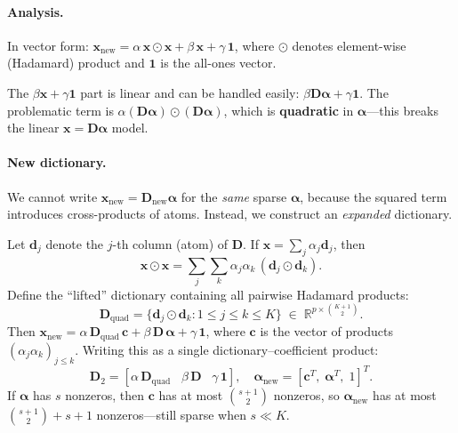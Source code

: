 \documentclass[11pt]{article}
\begin{document}
\paragraph{Analysis.}
In vector form: $\boldsymbol{x}_{\text{new}} = \alpha\,\boldsymbol{x} \odot \boldsymbol{x} + \beta\,\boldsymbol{x} + \gamma\,\boldsymbol{1}$,
where $\odot$ denotes element-wise (Hadamard) product and $\boldsymbol{1}$ is the all-ones vector.

The $\beta\boldsymbol{x} + \gamma\boldsymbol{1}$ part is linear and can be handled easily:
$\beta\boldsymbol{D}\boldsymbol{\alpha} + \gamma\boldsymbol{1}$.
The problematic term is $\alpha(\boldsymbol{D}\boldsymbol{\alpha})\odot(\boldsymbol{D}\boldsymbol{\alpha})$,
which is \textbf{quadratic} in $\boldsymbol{\alpha}$---this breaks the linear
$\boldsymbol{x} = \boldsymbol{D}\boldsymbol{\alpha}$ model.

\paragraph{New dictionary.}
We cannot write $\boldsymbol{x}_{\text{new}} = \boldsymbol{D}_{\text{new}}\boldsymbol{\alpha}$
for the \emph{same} sparse $\boldsymbol{\alpha}$, because the squared term introduces
cross-products of atoms. Instead, we construct an \emph{expanded} dictionary.

Let $\boldsymbol{d}_j$ denote the $j$-th column (atom) of $\boldsymbol{D}$. If
$\boldsymbol{x} = \sum_j \alpha_j \boldsymbol{d}_j$, then
\[
\boldsymbol{x}\odot\boldsymbol{x} = \sum_{j}\sum_{k}\alpha_j\alpha_k\,(\boldsymbol{d}_j\odot\boldsymbol{d}_k).
\]
Define the ``lifted'' dictionary containing all pairwise Hadamard products:
\[
\boldsymbol{D}_{\text{quad}} = \{\boldsymbol{d}_j \odot \boldsymbol{d}_k : 1 \leq j \leq k \leq K\}
\;\in\;\mathbb{R}^{p \times \binom{K+1}{2}}.
\]
Then $\boldsymbol{x}_{\text{new}} = \alpha\,\boldsymbol{D}_{\text{quad}}\,\boldsymbol{c}
+ \beta\,\boldsymbol{D}\,\boldsymbol{\alpha} + \gamma\,\boldsymbol{1}$,
where $\boldsymbol{c}$ is the vector of products $(\alpha_j\alpha_k)_{j \leq k}$.
Writing this as a single dictionary--coefficient product:
\[
\boxed{\boldsymbol{D}_2 = [\alpha\,\boldsymbol{D}_{\text{quad}} \;\;\; \beta\,\boldsymbol{D} \;\;\; \gamma\,\boldsymbol{1}],
\quad
\boldsymbol{\alpha}_{\text{new}} = [\boldsymbol{c}^T,\;\boldsymbol{\alpha}^T,\;1]^T.}
\]
If $\boldsymbol{\alpha}$ has $s$ nonzeros, then $\boldsymbol{c}$ has at most $\binom{s+1}{2}$ nonzeros,
so $\boldsymbol{\alpha}_{\text{new}}$ has at most $\binom{s+1}{2} + s + 1$ nonzeros---still
sparse when $s \ll K$.
\end{document}
